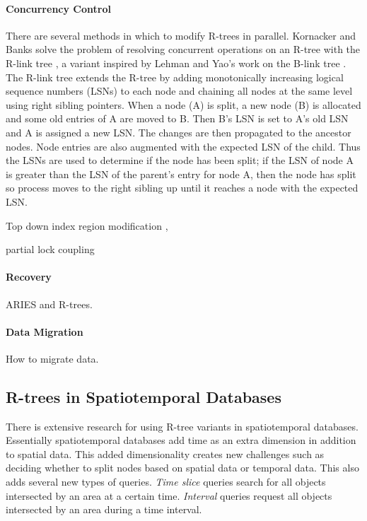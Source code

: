 \paragraph{Concurrency Control} 
There are several methods in which to modify R-trees in parallel. Kornacker
and Banks solve the problem of resolving concurrent operations on an R-tree
with the R-link tree \cite{kornacker1995high}, a variant inspired by Lehman
and Yao's work on the B-link tree \cite{lehman1981efficient}. The R-link tree
extends the R-tree by adding monotonically increasing logical sequence 
numbers (LSNs) to each node and chaining all nodes at the same level using 
right sibling pointers. When a node (A) is split, a new node (B) is allocated 
and some old entries of A are moved to B. Then B's LSN is set to A's old LSN
and A is assigned a new LSN. The changes are then propagated to the ancestor 
nodes. Node entries are also augmented with the expected 
LSN of the child. Thus the LSNs are used to determine if the node has been 
split; if the LSN of node A is greater than the LSN of the parent's entry
for node A, then the node has split so process moves to the right sibling up
until it reaches a node with the expected LSN.

Top down index region modification \cite{ravi1998improved},

partial lock coupling \cite{song2004enhanced}
	
\paragraph{Recovery} ARIES and R-trees.
	
\paragraph{Data Migration} How to migrate data.


\subsection{R-trees in Spatiotemporal Databases}
There is extensive research for using R-tree variants in spatiotemporal
databases. Essentially spatiotemporal databases add time as an extra dimension
in addition to spatial data. This added dimensionality creates new challenges
such as deciding whether to split nodes based on spatial data or temporal data. 
This also adds several new types of queries. \emph{Time slice}
queries search for all objects intersected by an area at a certain time. 
\emph{Interval} queries request all objects intersected by an area during a time
interval.

